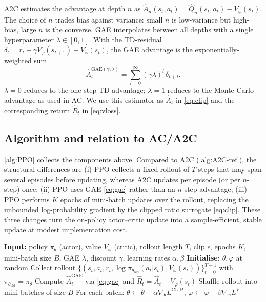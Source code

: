\documentclass{article}
\theoremstyle{plain}
\theoremstyle{definition}
\theoremstyle{remark}
\begin{document}
A2C estimates the advantage at depth $n$ as $\hat A_n(s_t,a_t)=\hat Q_n(s_t,a_t)-V_\varphi(s_t)$. The choice of $n$ trades bias against variance: small $n$ is low-variance but high-bias, large $n$ is the converse. GAE \cite{schulman2016gae} interpolates between all depths with a single hyperparameter $\lambda\in[0,1]$. With the TD-residual $\delta_t = r_t + \gamma V_\varphi(s_{t+1}) - V_\varphi(s_t)$, the GAE advantage is the exponentially-weighted sum
\begin{equation}
    \hat A_t^{\mathrm{GAE}(\gamma,\lambda)} = \sum_{l=0}^{\infty} (\gamma\lambda)^{l}\,\delta_{t+l}.
    \label{eq:gae}
\end{equation}
$\lambda=0$ reduces to the one-step TD advantage; $\lambda=1$ reduces to the Monte-Carlo advantage as used in AC. We use this estimator as $\hat A_t$ in \cref{eq:clip} and the corresponding return $\hat R_t$ in \cref{eq:vloss}.

\subsection{Algorithm and relation to AC/A2C}\label{sec:theory:alg}

\autoref{alg:PPO} collects the components above. Compared to A2C (\autoref{alg:A2C-ref}), the structural differences are (i) PPO collects a fixed rollout of $T$ steps that may span several episodes before updating, whereas A2C updates per episode (or per $n$-step) once; (ii) PPO uses GAE \cref{eq:gae} rather than an $n$-step advantage; (iii) PPO performs $K$ epochs of mini-batch updates over the rollout, replacing the unbounded log-probability gradient by the clipped ratio surrogate \cref{eq:clip}. These three changes turn the on-policy actor--critic update into a sample-efficient, stable update at modest implementation cost.

\begin{algorithm}[H]
    \caption{PPO-clipped with GAE}
    \begin{algorithmic}
        \STATE \textbf{Input:} policy $\pi_\theta$ (actor), value $V_\varphi$ (critic), rollout length $T$, clip $\epsilon$, epochs $K$, mini-batch size $B$, GAE $\lambda$, discount $\gamma$, learning rates $\alpha,\beta$
        \STATE \textbf{Initialise:} $\theta,\varphi$ at random
            \STATE Collect rollout $\{(s_t,a_t,r_t,\log\pi_{\theta_{\mathrm{old}}}(a_t|s_t),V_\varphi(s_t))\}_{t=0}^{T-1}$ with $\pi_{\theta_{\mathrm{old}}}=\pi_\theta$
            \STATE Compute $\hat A_t^{\mathrm{GAE}}$ via \cref{eq:gae} and $\hat R_t=\hat A_t+V_\varphi(s_t)$
                \STATE Shuffle rollout into mini-batches of size $B$
                \STATE For each batch: $\theta\!\leftarrow\!\theta\!+\!\alpha\nabla_\theta L^{\mathrm{CLIP}}$, $\varphi\!\leftarrow\!\varphi\!-\!\beta\nabla_\varphi L^{V}$
            \ENDFOR
        \ENDWHILE
    \end{algorithmic}
    \label{alg:PPO}
\end{algorithm}
\end{document}
